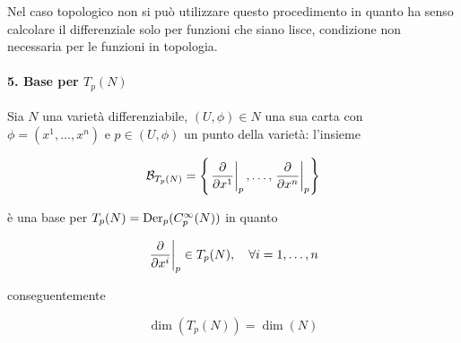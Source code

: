 Nel caso topologico non si può utilizzare questo procedimento in quanto ha senso calcolare il differenziale solo per funzioni che siano lisce, condizione non necessaria per le funzioni in topologia.

\paragraph{5. Base per $ T_{p}(N) $}

Sia $ N $ una varietà differenziabile, $ (U,\phi) \in N $ una sua carta con $ \phi = (x^{1},\dots,x^{n}) $ e $ p \in (U,\phi) $ un punto della varietà: l'insieme

\begin{equation}
	\mathcal{B}_{T_{p}(N)} = \left\{ \eval{ \pdv{x^{1}} }_{p}, \dots, \eval{ \pdv{x^{n}} }_{p} \right\}
\end{equation}

è una base per $ T_{p}(N) = \operatorname{Der}_{p}(C_{p}^{\infty}(N)) $ in quanto

\begin{equation}
	\left. \dfrac{\partial}{\partial x^{i}} \right|_{p} \in T_{p}(N) \qcomma \forall i=1,\dots,n
\end{equation}

conseguentemente

\begin{equation}
	\dim(T_{p}(N)) = \dim(N)
\end{equation}

